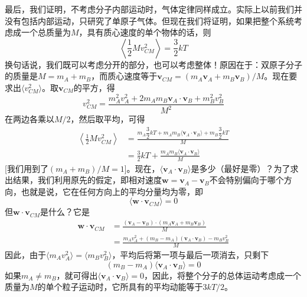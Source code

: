 最后，我们证明，不考虑分子内部运动时，气体定律同样成立。实际上以前我们并没有包括内部运动，只研究了单原子气体。但现在我们将证明，如果把整个系统考虑成一个总质量为$M$，具有质心速度的单个物体的话，则
\begin{equation}
    \label{Eq:I:39:24}
    \left\langle \frac{1}{2}Mv_{CM}^2 \right\rangle = \frac{3}{2}kT
\end{equation}
换句话说，我们既可以考虑分开的部分，也可以考虑整体！原因在于：双原子分子的质量是$M=m_A+m_B$，而质心速度等于$\boldsymbol{v}_{CM}=(m_A\boldsymbol{v}_A+m_B\boldsymbol{v}_B)/M$。现在要求出$\langle v^2_{CM} \rangle$。取$\boldsymbol{v}_{CM}$的平方，得
\begin{equation*}
    v_{CM}^2 = \frac{m_A^2v_A^2 + 2m_Am_B\boldsymbol{v}_A\cdot\boldsymbol{v}_B + m_B^2v_B^2}{M^2}
\end{equation*}
在两边各乘以$M/2$，然后取平均，可得
\begin{equation*}
    \begin{aligned}
        \left\langle \frac{1}{2}Mv_{CM}^2 \right\rangle &= \frac{m_A\dfrac{3}{2}kT + m_Am_B\langle \boldsymbol{v}_A\cdot\boldsymbol{v}_B \rangle + m_B\dfrac{3}{2}kT}{M} \\
        &= \frac{3}{2}kT + \frac{m_Am_B\langle \boldsymbol{v}_A\cdot\boldsymbol{v}_B \rangle}{M}
    \end{aligned}
\end{equation*}
[我们用到了$(m_A+m_B)/M=1$]。现在，$\langle \boldsymbol{v}_A\cdot\boldsymbol{v}_B \rangle$是多少（最好是零）？为了求出结果，我们利用原先的假定，即相对速度$\boldsymbol{w}=\boldsymbol{v}_A-\boldsymbol{v}_B$不会特别偏向于哪个方向，也就是说，它在任何方向上的平均分量均为零，即
\begin{equation*}
    \langle \boldsymbol{w}\cdot\boldsymbol{v}_{CM} \rangle = 0
\end{equation*}
但$\boldsymbol{w}\cdot\boldsymbol{v}_{CM}$是什么？它是
\begin{equation*}
    \begin{aligned}
        \boldsymbol{w}\cdot\boldsymbol{v}_{CM} &= \frac{(\boldsymbol{v}_A - \boldsymbol{v}_B) \cdot (m_A\boldsymbol{v}_A + m_B\boldsymbol{v}_B)}{M} \\
        &= \frac{m_Av_A^2 + (m_B-m_A)(\boldsymbol{v}_A\cdot\boldsymbol{v}_B) - m_Bv_B^2}{M}
    \end{aligned}
\end{equation*}
因此，由于$\langle m_Av_A^2 \rangle = \langle m_Bv_B^2 \rangle$，平均后将第一项与最后一项消去，只剩下
\begin{equation*}
    (m_B - m_A) \langle \boldsymbol{v}_A\cdot\boldsymbol{v}_B \rangle = 0
\end{equation*}
如果$m_A \neq m_B$，就可得出$ \langle \boldsymbol{v}_A\cdot\boldsymbol{v}_B \rangle = 0$，因此，将整个分子的总体运动考虑成一个质量为$M$的单个粒子运动时，它所具有的平均动能等于$3kT/2$。

